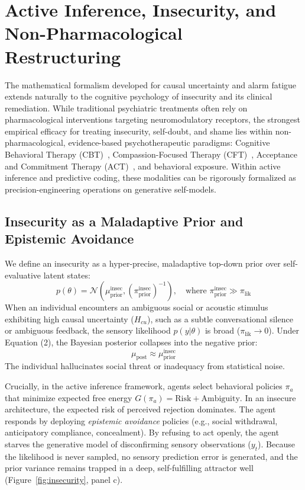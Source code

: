 \documentclass[conference]{IEEEtran}
\begin{document}
\section{Active Inference, Insecurity, and Non-Pharmacological Restructuring}

The mathematical formalism developed for causal uncertainty and alarm fatigue extends naturally to the cognitive psychology of insecurity and its clinical remediation. While traditional psychiatric treatments often rely on pharmacological interventions targeting neuromodulatory receptors, the strongest empirical efficacy for treating insecurity, self-doubt, and shame lies within non-pharmacological, evidence-based psychotherapeutic paradigms: Cognitive Behavioral Therapy (CBT)~\cite{b5}, Compassion-Focused Therapy (CFT)~\cite{b6}, Acceptance and Commitment Therapy (ACT)~\cite{b7}, and behavioral exposure. Within active inference and predictive coding, these modalities can be rigorously formalized as precision-engineering operations on generative self-models.

\subsection{Insecurity as a Maladaptive Prior and Epistemic Avoidance}
We define an insecurity as a hyper-precise, maladaptive top-down prior over self-evaluative latent states:
\begin{equation}
    p(\theta) = \mathcal{N}\left(\mu_{\text{prior}}^{\text{insec}}, (\pi_{\text{prior}}^{\text{insec}})^{-1}\right), \quad \text{where } \pi_{\text{prior}}^{\text{insec}} \gg \pi_{\text{lik}}
\end{equation}
When an individual encounters an ambiguous social or acoustic stimulus exhibiting high causal uncertainty ($H_{cu}$), such as a subtle conversational silence or ambiguous feedback, the sensory likelihood $p(y|\theta)$ is broad ($\pi_{\text{lik}} \to 0$). Under Equation (2), the Bayesian posterior collapses into the negative prior:
\begin{equation}
    \mu_{\text{post}} \approx \mu_{\text{prior}}^{\text{insec}}
\end{equation}
The individual hallucinates social threat or inadequacy from statistical noise. 

Crucially, in the active inference framework, agents select behavioral policies $\pi_a$ that minimize expected free energy $G(\pi_a) = \text{Risk} + \text{Ambiguity}$. In an insecure architecture, the expected risk of perceived rejection dominates. The agent responds by deploying \emph{epistemic avoidance} policies (e.g., social withdrawal, anticipatory compliance, concealment). By refusing to act openly, the agent starves the generative model of disconfirming sensory observations ($y_t$). Because the likelihood is never sampled, no sensory prediction error is generated, and the prior variance remains trapped in a deep, self-fulfilling attractor well (Figure~\ref{fig:insecurity}, panel c).
\end{document}
